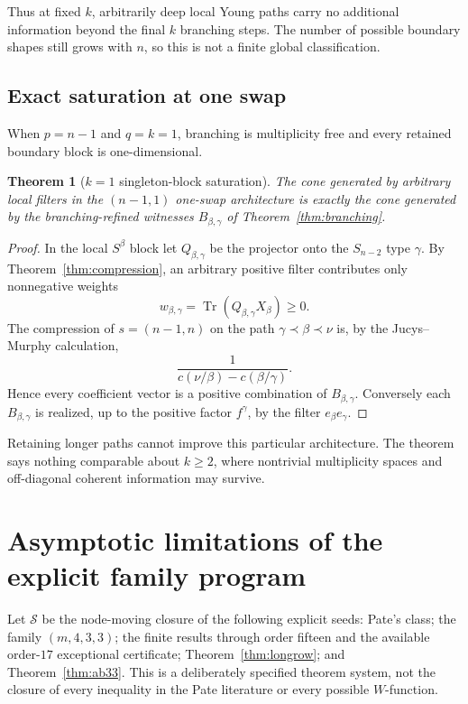 \documentclass[11pt]{article}
\newtheorem{theorem}{Theorem}[section]
\theoremstyle{definition}
\newcommand{\Tr}{\operatorname{Tr}}
\newcommand{\youngcovered}{\prec}
\begin{document}
Thus at fixed $k$, arbitrarily deep local Young paths carry no additional information beyond the final $k$ branching steps.  The number of possible boundary shapes still grows with $n$, so this is not a finite global classification.

\subsection{Exact saturation at one swap}
When $p=n-1$ and $q=k=1$, branching is multiplicity free and every retained boundary block is one-dimensional.

\begin{theorem}[$k=1$ singleton-block saturation]\label{thm:saturation}
The cone generated by arbitrary local filters in the $(n-1,1)$ one-swap architecture is exactly the cone generated by the branching-refined witnesses $B_{\beta,\gamma}$ of Theorem~\ref{thm:branching}.
\end{theorem}
\begin{proof}
In the local $S^\beta$ block let $Q_{\beta,\gamma}$ be the projector onto the $S_{n-2}$ type $\gamma$.  By Theorem~\ref{thm:compression}, an arbitrary positive filter contributes only nonnegative weights
\[
 w_{\beta,\gamma}=\Tr(Q_{\beta,\gamma}X_\beta)\ge0.
\]
The compression of $s=(n-1,n)$ on the path $\gamma\youngcovered\beta\youngcovered\nu$ is, by the Jucys--Murphy calculation,
\[
 \frac1{c(\nu/\beta)-c(\beta/\gamma)}.
\]
Hence every coefficient vector is a positive combination of $B_{\beta,\gamma}$.  Conversely each $B_{\beta,\gamma}$ is realized, up to the positive factor $f^\gamma$, by the filter $e_\beta e_\gamma$.
\end{proof}

Retaining longer paths cannot improve this particular architecture.  The theorem says nothing comparable about $k\ge2$, where nontrivial multiplicity spaces and off-diagonal coherent information may survive.

\section{Asymptotic limitations of the explicit family program}\label{sec:density}
Let $\mathcal S$ be the node-moving closure of the following explicit seeds: Pate's class; the family $(m,4,3,3)$; the finite results through order fifteen and the available order-$17$ exceptional certificate; Theorem~\ref{thm:longrow}; and Theorem~\ref{thm:ab33}.  This is a deliberately specified theorem system, not the closure of every inequality in the Pate literature or every possible $W$-function.
\end{document}
